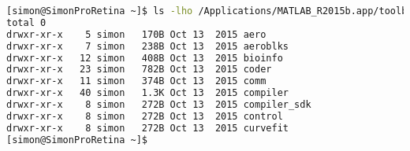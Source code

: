 \begin{lstlisting}[language=bash]
[simon@SimonProRetina ~]$ ls -lho /Applications/MATLAB_R2015b.app/toolbox/ | head
total 0
drwxr-xr-x    5 simon   170B Oct 13  2015 aero
drwxr-xr-x    7 simon   238B Oct 13  2015 aeroblks
drwxr-xr-x   12 simon   408B Oct 13  2015 bioinfo
drwxr-xr-x   23 simon   782B Oct 13  2015 coder
drwxr-xr-x   11 simon   374B Oct 13  2015 comm
drwxr-xr-x   40 simon   1.3K Oct 13  2015 compiler
drwxr-xr-x    8 simon   272B Oct 13  2015 compiler_sdk
drwxr-xr-x    8 simon   272B Oct 13  2015 control
drwxr-xr-x    8 simon   272B Oct 13  2015 curvefit
[simon@SimonProRetina ~]$

\end{lstlisting}